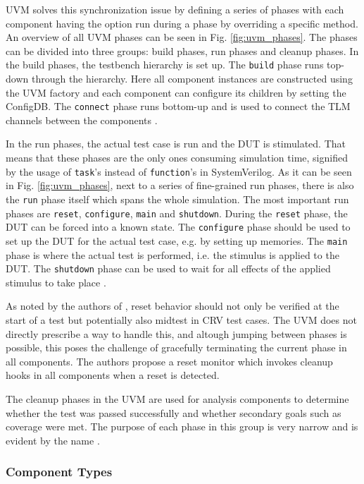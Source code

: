 \documentclass[12pt]{report}
\newcommand{\ttt}{\texttt}
\begin{document}
UVM solves this synchronization issue by defining a series of phases with each component having the option run during
a phase by overriding a specific method. An overview of all UVM phases can be seen in Fig. \ref{fig:uvm_phases}. The
phases can be divided into three groups: build phases, run phases and cleanup phases. In the build phases, the
testbench hierarchy is set up. The \ttt{build} phase runs top-down through the hierarchy. Here all component
instances are constructed using the UVM factory and each component can configure its children by setting the
ConfigDB. The \ttt{connect} phase runs bottom-up and is used to connect the TLM channels between the components
\cite[ch. 4.6]{mehta2018asic}.

In the run phases, the actual test case is run and the DUT is stimulated. That means that these phases are the only
ones consuming simulation time, signified by the usage of \ttt{task}'s instead of \ttt{function}'s in SystemVerilog.
As it can be seen in Fig. \ref{fig:uvm_phases}, next to a series of fine-grained run phases, there is also the
\ttt{run} phase itself which spans the whole simulation. The most important run phases are \ttt{reset},
\ttt{configure}, \ttt{main} and \ttt{shutdown}. During the \ttt{reset} phase, the DUT can be forced into a known
state. The \ttt{configure} phase should be used to set up the DUT for the actual test case, e.g. by setting up
memories. The \ttt{main} phase is where the actual test is performed, i.e. the stimulus is applied to the DUT. The
\ttt{shutdown} phase can be used to wait for all effects of the applied stimulus to take place \cite[ch. 4.6]{mehta2018asic}.

As noted by the authors of \cite{dvcon2014reset}, reset behavior should not only be verified at the start of a test
but potentially also midtest in CRV test cases. The UVM does not directly prescribe a way to handle this, and altough
jumping between phases is possible, this poses the challenge of gracefully terminating the current phase in all
components. The authors propose a reset monitor which invokes cleanup hooks in all components when a reset is detected.

The cleanup phases in the UVM are used for analysis components to determine whether the test was passed successfully
and whether secondary goals such as coverage were met. The purpose of each phase in this group is very narrow and is
evident by the name \cite[ch. 4.6]{mehta2018asic}.

\subsubsection{Component Types} %
\end{document}
